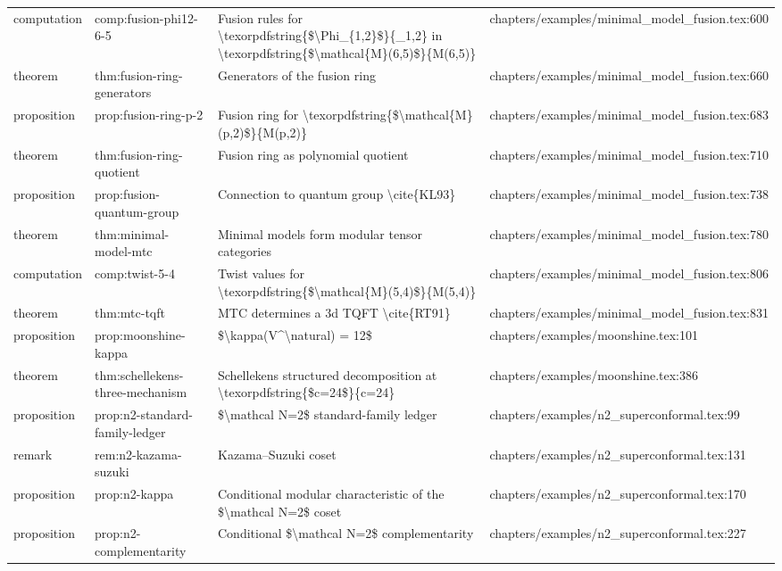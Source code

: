 \documentclass[11pt]{article}
\begin{document}
\begin{longtable}{L{0.10\textwidth}L{0.26\textwidth}L{0.42\textwidth}L{0.22\textwidth}}
computation & comp:fusion-phi12-6-5 & Fusion rules for \textbackslash{}texorpdfstring\{\$\textbackslash{}Phi\_\{1,2\}\$\}\{\_1,2\} in \textbackslash{}texorpdfstring\{\$\textbackslash{}mathcal\{M\}(6,5)\$\}\{M(6,5)\} & chapters/examples/minimal\_model\_fusion.tex:600\\
theorem & thm:fusion-ring-generators & Generators of the fusion ring & chapters/examples/minimal\_model\_fusion.tex:660\\
proposition & prop:fusion-ring-p-2 & Fusion ring for \textbackslash{}texorpdfstring\{\$\textbackslash{}mathcal\{M\}(p,2)\$\}\{M(p,2)\} & chapters/examples/minimal\_model\_fusion.tex:683\\
theorem & thm:fusion-ring-quotient & Fusion ring as polynomial quotient & chapters/examples/minimal\_model\_fusion.tex:710\\
proposition & prop:fusion-quantum-group & Connection to quantum group \textbackslash{}cite\{KL93\} & chapters/examples/minimal\_model\_fusion.tex:738\\
theorem & thm:minimal-model-mtc & Minimal models form modular tensor categories & chapters/examples/minimal\_model\_fusion.tex:780\\
computation & comp:twist-5-4 & Twist values for \textbackslash{}texorpdfstring\{\$\textbackslash{}mathcal\{M\}(5,4)\$\}\{M(5,4)\} & chapters/examples/minimal\_model\_fusion.tex:806\\
theorem & thm:mtc-tqft & MTC determines a 3d TQFT \textbackslash{}cite\{RT91\} & chapters/examples/minimal\_model\_fusion.tex:831\\
proposition & prop:moonshine-kappa & \$\textbackslash{}kappa(V\textasciicircum{}\textbackslash{}natural) = 12\$ & chapters/examples/moonshine.tex:101\\
theorem & thm:schellekens-three-mechanism & Schellekens structured decomposition at \textbackslash{}texorpdfstring\{\$c=24\$\}\{c=24\} & chapters/examples/moonshine.tex:386\\
proposition & prop:n2-standard-family-led{}ger & \$\textbackslash{}mathcal N=2\$ standard-family led{}ger & chapters/examples/n2\_superconformal.tex:99\\
remark & rem:n2-kazama-suzuki & Kazama--Suzuki coset & chapters/examples/n2\_superconformal.tex:131\\
proposition & prop:n2-kappa & Cond{}itional modular characteristic of the \$\textbackslash{}mathcal N=2\$ coset & chapters/examples/n2\_superconformal.tex:170\\
proposition & prop:n2-complementarity & Cond{}itional \$\textbackslash{}mathcal N=2\$ complementarity & chapters/examples/n2\_superconformal.tex:227\\

\end{longtable}
\end{document}
